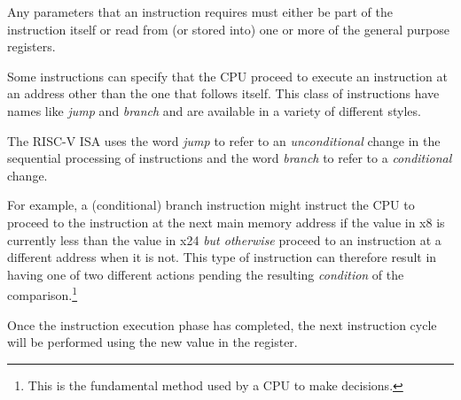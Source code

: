 Any parameters that an instruction requires must either be part of 
the instruction itself or read from (or stored into) one or more of the 
general purpose registers.

Some instructions can specify that the CPU proceed to execute an
instruction at an address other than the one that follows itself.
This class of instructions have names like {\em jump} and {\em branch}
and are available in a variety of different styles.

The RISC-V ISA uses the word {\em jump} to refer to an {\em unconditional}
change in the sequential processing of instructions and the word
{\em branch} to refer to a {\em conditional} change.

For example, a (conditional) branch instruction might instruct the CPU 
to proceed to the instruction at the next main memory address if the value 
in x8 is currently less than the value in x24 {\em but otherwise} 
proceed to an instruction at a different address
when it is not.  This type of instruction can therefore result in having 
one of two different actions pending the resulting {\em condition} of 
the comparison.\footnote{This is the fundamental method used by a CPU 
to make decisions.}

Once the instruction execution phase has completed, the next instruction 
cycle will be performed using the new value in the  register.
